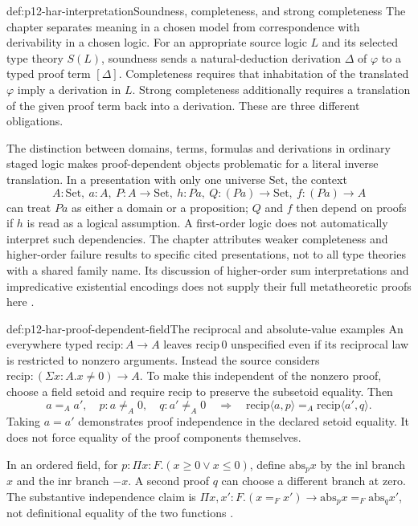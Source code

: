 \begin{hbdefinition}{def:p12-har-interpretation}{Soundness, completeness, and strong completeness}
The chapter separates meaning in a chosen model from correspondence with
derivability in a chosen logic. For an appropriate source logic \(L\)
and its selected type theory \(S(L)\), soundness sends a
natural-deduction derivation \(\Delta\) of \(\varphi\) to a
typed proof term \([\Delta]\). Completeness requires that inhabitation
of the translated \(\varphi\) imply a derivation in \(L\).
Strong completeness additionally requires a translation of the given proof
term back into a derivation. These are three different obligations.

The distinction between domains, terms, formulas and derivations in
ordinary staged logic makes proof-dependent objects problematic for a
literal inverse translation. In a presentation with only one universe
\(\mathrm{Set}\), the context
\[
 A:\mathrm{Set},\ a:A,\ P:A\to\mathrm{Set},\ h:Pa,
 \ Q:(Pa)\to\mathrm{Set},\ f:(Pa)\to A
\]
can treat \(Pa\) as either a domain or a proposition; \(Q\) and
\(f\) then depend on proofs if \(h\) is read as a logical assumption.
A first-order logic does not automatically interpret such dependencies.
The chapter attributes weaker completeness and higher-order failure results
to specific cited presentations, not to all type theories with a shared
family name. Its discussion of higher-order sum interpretations and
impredicative existential encodings does not supply their full metatheoretic
proofs here \cite[pp.~1175--1178]{BarendregtGeuvers2001}.
\end{hbdefinition}

\begin{hbexample}{def:p12-har-proof-dependent-field}{The reciprocal and absolute-value examples}
An everywhere typed \(\mathrm{recip}:A\to A\) leaves
\(\mathrm{recip}\,0\) unspecified even if its reciprocal law is
restricted to nonzero arguments. Instead the source considers
\(\mathrm{recip}:(\Sigma x:A.x\ne0)\to A\).
To make this independent of the nonzero proof, choose a field setoid and
require \(\mathrm{recip}\) to preserve the subsetoid equality. Then
\[
 a=_A a',\quad p:a\ne_A0,\quad q:a'\ne_A0
 \quad\Longrightarrow\quad
 \mathrm{recip}\langle a,p\rangle=_A
 \mathrm{recip}\langle a',q\rangle.
\]
Taking \(a=a'\) demonstrates proof independence in the declared setoid
equality. It does not force equality of the proof components themselves.

In an ordered field, for
\(p:\Pi x:F.(x\ge0\lor x\le0)\), define
\(\mathrm{abs}_p x\) by the \(\mathrm{inl}\) branch \(x\)
and the \(\mathrm{inr}\) branch \(-x\). A second proof \(q\)
can choose a different branch at zero. The substantive independence claim
is \(\Pi x,x':F.(x=_F x')\to
\mathrm{abs}_p x=_F\mathrm{abs}_q x'\), not definitional equality
of the two functions \cite[pp.~1178--1180]{BarendregtGeuvers2001}.
\end{hbexample}

